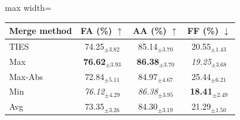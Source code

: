 \renewcommand{\arraystretch}{0.95}
\begin{adjustbox}{max width=\textwidth}
\footnotesize
\begin{tabular}{l c c c}
\toprule
Merge method & \textbf{FA (\%)} $\uparrow$ & \textbf{AA (\%)} $\uparrow$ & \textbf{FF (\%)} $\downarrow$ \\
\midrule
TIES & 74.25$_{\pm 3.82}$ & 85.14$_{\pm 3.70}$ & 20.55$_{\pm 1.43}$ \\
Max & \textbf{76.62}$_{\pm 3.93}$ & \textbf{86.38}$_{\pm 3.70}$ & \textit{19.25}$_{\pm 3.68}$ \\
Max-Abs & 72.84$_{\pm 5.11}$ & 84.97$_{\pm 4.67}$ & 25.44$_{\pm 6.21}$ \\
Min & \textit{76.12}$_{\pm 4.29}$ & \textit{86.38}$_{\pm 3.95}$ & \textbf{18.41}$_{\pm 2.49}$ \\
Avg & 73.35$_{\pm 3.26}$ & 84.30$_{\pm 3.19}$ & 21.29$_{\pm 1.50}$ \\
\bottomrule
\end{tabular}
\end{adjustbox}